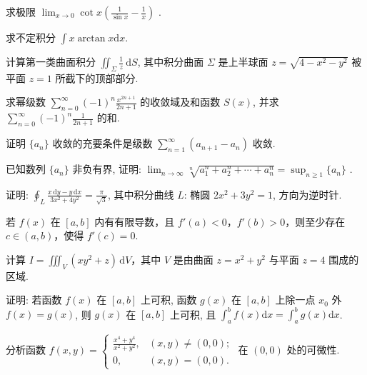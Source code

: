 求极限  $\lim_{x\to0}\cot x\left(\frac{1}{\sin x}-\frac{1}{x}\right)$ .\par
求不定积分 $\int x\arctan x\mathrm{d}x.$\par
计算第一类曲面积分 $\iint_{\Sigma} \frac{1}{z} \mathrm{~d} S$, 其中积分曲面 $\Sigma$ 是上半球面 $z = \sqrt{4 - x^2 - y^2}$ 被平面 $z = 1$ 所截下的顶部部分.\par
求幂级数 $\sum_{n=0}^{\infty} (-1)^n \frac{x^{2n+1}}{2n+1}$ 的收敛域及和函数 $S(x)$, 并求 $\sum_{n=0}^{\infty} (-1)^n \frac{1}{2n+1}$ 的和.\par
证明 $\{a_{n}\}$ 收敛的充要条件是级数 $\sum_{n=1}^{\infty}(a_{n+1} - a_{n})$ 收敛.\par
已知数列  $\{a_{n}\}$  非负有界, 证明:  $\lim_{n\to\infty}\sqrt[n]{a_{1}^{n}+a_{2}^{n}+\cdots+a_{n}^{n}}=\sup_{n\geq1}\{a_{n}\}$ .\par
证明: $\oint_{L} \frac{x \, \mathrm{d}y - y \, \mathrm{d}x}{3x^{2} + 4y^{2}} = \frac{\pi}{\sqrt{3}}$, 其中积分曲线 $L$: 椭圆 $2x^{2} + 3y^{2} = 1$, 方向为逆时针.\par
若 $f(x)$ 在 $[a, b]$ 内有有限导数，且 $f'(a) < 0$，$f'(b) > 0$，则至少存在 $c \in (a, b)$，使得 $f'(c) = 0$.\par
计算 $I = \iiint_{V} (xy^{2} + z) \, \mathrm{d}V$，其中 $V$ 是由曲面 $z = x^{2} + y^{2}$ 与平面 $z = 4$ 围成的区域.\par
证明: 若函数 $f(x)$ 在 $[a, b]$ 上可积, 函数 $g(x)$ 在 $[a, b]$ 上除一点 $x_0$ 外 $f(x) = g(x)$, 则 $g(x)$ 在 $[a, b]$ 上可积, 且 $\int_{a}^{b} f(x) \mathrm{d}x = \int_{a}^{b} g(x) \mathrm{d}x$.\par
分析函数 $f(x, y) = \begin{cases} \frac{x^4 + y^4}{x^2 + y^2}, & (x, y) \neq (0, 0); \\ 0, & (x, y) = (0, 0). \end{cases}$ 在 $(0, 0)$ 处的可微性.\par
